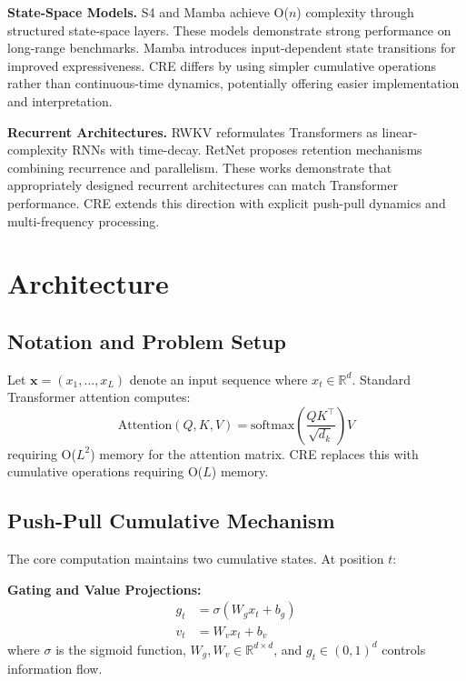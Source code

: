\documentclass{article}
\begin{document}
\textbf{State-Space Models.} S4 \citep{gu2022efficiently} and Mamba \citep{gu2023mamba} achieve O($n$) complexity through structured state-space layers. These models demonstrate strong performance on long-range benchmarks. Mamba introduces input-dependent state transitions for improved expressiveness. CRE differs by using simpler cumulative operations rather than continuous-time dynamics, potentially offering easier implementation and interpretation.

\textbf{Recurrent Architectures.} RWKV \citep{peng2023rwkv} reformulates Transformers as linear-complexity RNNs with time-decay. RetNet \citep{sun2023retentive} proposes retention mechanisms combining recurrence and parallelism. These works demonstrate that appropriately designed recurrent architectures can match Transformer performance. CRE extends this direction with explicit push-pull dynamics and multi-frequency processing.

\section{Architecture}

\subsection{Notation and Problem Setup}

Let $\mathbf{x} = (x_1, \ldots, x_L)$ denote an input sequence where $x_t \in \mathbb{R}^d$. Standard Transformer attention computes:
\begin{equation}
\text{Attention}(Q, K, V) = \text{softmax}\left(\frac{QK^\top}{\sqrt{d_k}}\right)V
\end{equation}
requiring O($L^2$) memory for the attention matrix. CRE replaces this with cumulative operations requiring O($L$) memory.

\subsection{Push-Pull Cumulative Mechanism}

The core computation maintains two cumulative states. At position $t$:

\textbf{Gating and Value Projections:}
\begin{align}
g_t &= \sigma(W_g x_t + b_g) \\
v_t &= W_v x_t + b_v
\end{align}
where $\sigma$ is the sigmoid function, $W_g, W_v \in \mathbb{R}^{d \times d}$, and $g_t \in (0,1)^d$ controls information flow.
\end{document}

